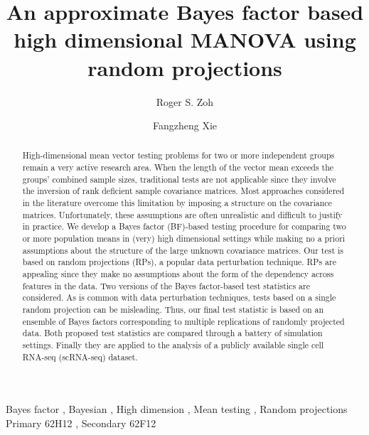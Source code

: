 \documentclass[times,sort&compress,3p]{elsarticle}
\theoremstyle{plain}%
\theoremstyle{definition}
\begin{document}
\begin{frontmatter}

\title{An approximate Bayes factor based high dimensional MANOVA using random projections}

\author[1]{Roger S. Zoh }
\author[2]{Fangzheng Xie}

\address[1]{Department of Epidemiology \& Biostatistics, Indiana University, Bloomington, IN 47405, USA}
\address[2]{Department of Statistics, Indiana University, Bloomington, IN 47408, USA}


\begin{abstract}
High-dimensional mean vector testing problems for two or more independent groups remain a very active research area. When the length of the vector mean exceeds the groups' combined sample sizes, traditional tests are not applicable since they involve the inversion of rank deficient sample covariance matrices. Most approaches considered in the literature overcome this limitation by imposing a structure on the covariance matrices. Unfortunately, these assumptions are often unrealistic and difficult to justify in practice. 
We develop a Bayes factor (BF)-based testing procedure for comparing two or more population means in (very) high dimensional settings while making no a priori assumptions about the structure of the large unknown covariance matrices. Our test is based on random projections (RPs), a popular data perturbation technique. RPs are appealing since they make no assumptions about the form of the dependency across features in the data. Two versions of the Bayes factor-based test statistics are considered. As is common with data perturbation techniques, tests based on a single random projection can be misleading. Thus, our final test statistic is based on an ensemble of Bayes factors corresponding to multiple replications of randomly projected data. Both proposed test statistics are compared through a battery of simulation settings. Finally they are applied to the analysis of a publicly available single cell RNA-seq (scRNA-seq) dataset. 
\end{abstract}

\begin{keyword} %
Bayes factor \sep
Bayesian \sep
High dimension \sep
Mean testing \sep
Random projections 
\MSC[2020] Primary 62H12 \sep
Secondary 62F12
\end{keyword}

\end{frontmatter}
\end{document}
